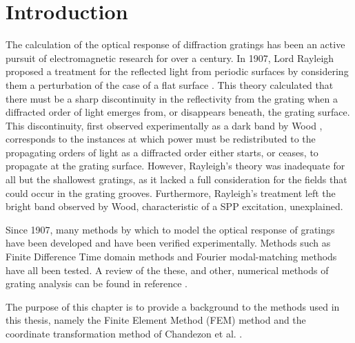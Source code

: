 \section{Introduction}
The calculation of the optical response of diffraction gratings has been an active pursuit of electromagnetic research for over a century. In 1907, Lord Rayleigh proposed a treatment for the reflected light from periodic surfaces by considering them a perturbation of the case of a flat surface \cite{Rayleigh1907a}. This theory calculated that there must be a sharp discontinuity in the reflectivity from the grating when a diffracted order of light emerges from, or disappears beneath, the grating surface. This discontinuity, first observed experimentally as a dark band by Wood \cite{Light}, corresponds to the instances at which power must be redistributed to the propagating orders of light as a diffracted order either starts, or ceases, to propagate at the grating surface. However, Rayleigh's theory was inadequate for all but the shallowest gratings,  as it lacked a full consideration for the fields that could occur in the grating grooves. Furthermore, Rayleigh's treatment left the bright band observed by Wood, characteristic of a SPP excitation, unexplained.

Since 1907, many methods by which to model the optical response of gratings have been developed and have been verified experimentally. Methods such as Finite Difference Time domain methods and Fourier modal-matching methods have all been tested. A review of the these, and other, numerical methods of grating analysis can be found in reference \cite{Bao}.

The purpose of this chapter is to provide a background to the methods used in this thesis, namely the Finite Element Method (FEM) method and the coordinate transformation method of Chandezon et al. \cite{Chandezon1980}.

